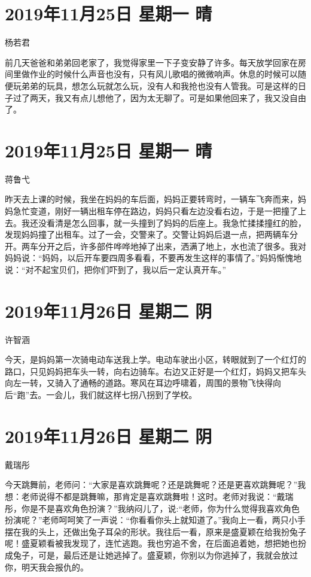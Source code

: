 \section{2019年11月25日 星期一 晴}

杨若君

前几天爸爸和弟弟回老家了，我觉得家里一下子变安静了许多。每天放学回家在房间里做作业的时候什么声音也没有，只有风儿歌唱的微微响声。休息的时候可以随便玩弟弟的玩具，想怎么玩就怎么玩，没有人和我抢也没有人管我。可是这样的日子过了两天，我又有点儿想他了，因为太无聊了。可是如果他回来了，我又没自由了。

\section{2019年11月25日 星期一 晴}

蒋鲁弋

昨天去上课的时候，我坐在妈妈的车后面，妈妈正要转弯时，一辆车飞奔而来，妈妈急忙变道，刚好一辆出租车停在路边，妈妈只看左边没看右边，于是一把撞了上去。我还没看清是怎么回事，就一头撞到了妈妈的后座上。我急忙揉揉撞红的脸，发现妈妈撞了出租车。过了一会，交警来了。交警让妈妈后退一点，把两辆车分开。两车分开之后，许多部件哗哗地掉了出来，洒满了地上，水也流了很多。我对妈妈说：``妈妈，以后开车要四周多看看，不要再发生这样的事情了。''妈妈惭愧地说：``对不起宝贝们，把你们吓到了，我以后一定认真开车。''

\section{2019年11月26日 星期二 阴}

许智涵

今天，是妈妈第一次骑电动车送我上学。电动车驶出小区，转眼就到了一个红灯的路口，只见妈妈把车头一转，向右边骑车。右边又正好是一个红灯，妈妈又把车头向左一转，又骑入了通畅的道路。寒风在耳边呼啸着，周围的景物飞快得向后``跑''去。一会儿，我们就这样七拐八拐到了学校。

\section{2019年11月26日 星期二 阴}

戴瑞彤

今天跳舞前，老师问：``大家是喜欢跳舞呢？还是跳舞呢？还是更喜欢跳舞呢？''我想：老师说得不都是跳舞嘛，那肯定是喜欢跳舞啦！这时。老师对我说：``戴瑞彤，你是不是喜欢角色扮演？''我纳闷儿了，说:``老师，你为什么觉得我喜欢角色扮演呢？''老师呵呵笑了一声说：``你看看你头上就知道了。''我向上一看，两只小手摆在我的头上，还做出兔子耳朵的形状。我往后一看，原来是盛夏颖在给我扮兔子呢！盛夏颖看被我发现了，连忙逃跑。我也穷追不舍，在后面追着她，想把她也扮成兔子，可是，最后还是让她逃掉了。盛夏颖，你别以为你逃掉了，我就会放过你，明天我会报仇的。

